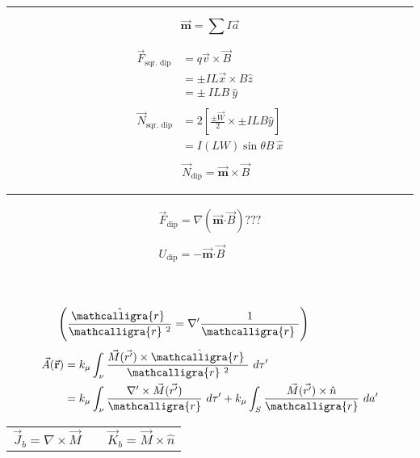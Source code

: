 \documentclass[12pt]{article}
\newcommand{\scripty}[1]{\ensuremath{\mathcalligra{#1}}}
\newcommand*{\cursr}{\scripty{r}}		%
\newcommand*{\cursrr}{\scripty{r}\ }
\newcommand*{\dotP}{\boldsymbol \cdot}		%
\begin{document}
\hspace{0\textwidth}
\rule[-400pt]{.5pt}{400pt}
\hspace{0.01\textwidth}
\begin{minipage}[t]{0.5\textwidth}	
	\[\boxed{ \vec{ \mathbf{m} } = \sum I \vec{a} }\]
	\begin{minipage}[t]{0.5\textwidth}
		\begin{align*} 
			\vec{F}_{\text{sqr. dip}} &= q \vec{v} \times \vec{B} \\
			&= \pm IL \vec{x} \times B \hat{z} \\
			&= \pm \ I L B \ \hat{y} \\ \\
			\vec{N}_{\text{sqr. dip}} &= 2 \left[ \frac{\pm \vec{W}}{2} \times \pm I L B \hat{y} \right] \\
			&= I(LW) \sin{\theta} B \ \hat{x} \\ \\
			&\boxed{ \vec{N}_{\text{dip}} = \vec{\mathbf{m}} \times \vec{B} }
		\end{align*}
	\end{minipage}
	\hspace{0.01\textwidth}
	\rule[-185pt]{.5pt}{185pt}
	\begin{minipage}[t]{0.4\textwidth}
		\begin{gather*} 
			\boxed{ \vec{F}_{\text{dip}} = \nabla ( \vec{\mathbf{m}} \dotP \vec{B} ) } ??? \\ \\
			\boxed{ U_{\text{dip}} =  - \vec{ \mathbf{m} } \dotP \vec{B} }
		\end{gather*}
	\end{minipage}

	\hfill \break \\ \\
	 \ \ \ \ \ \ \ \ \
	\( \displaystyle \left( \frac{\hat{ \cursrr }}{\cursrr^2} = \nabla' \frac{1}{\cursrr} \right) \)
	\hfill \break
	\begin{align*}
		\vec{A}(\vec{ \mathbf{r} }) &= k_\mu \int_\nu \frac{ \vec{M}( \vec{r'} ) 
			\times \hat{ \cursrr } }{\cursrr^2} \ d\tau' \\
		&= k_\mu \int_\nu \frac{ \nabla' \times \vec{M}( \vec{r'} ) }{\cursr} \ d\tau' 
			+ k_\mu \int_S \frac{ \vec{M}( \vec{r'} ) \times \hat{n} }{\cursr} \ da'
	\end{align*}
	\begin{center}
		\begin{tabular}{c m{.1cm} c}
			\( \boxed{ \vec{J}_b = \nabla \times \vec{M} } \) 
			& &
			\( \boxed{ \vec{K}_b = \vec{M} \times \hat{n} } \)
		\end{tabular}
	\end{center}

\end{minipage}
\end{document}
